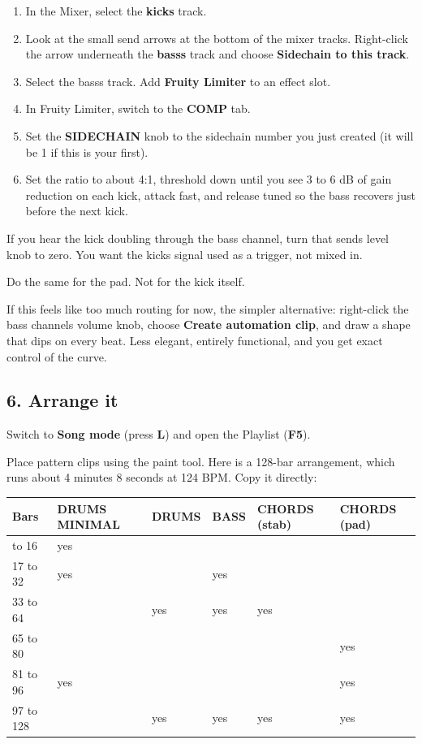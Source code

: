 \begin{enumerate}
\def\labelenumi{\arabic{enumi}.}
\tightlist
\item
  In the Mixer, select the \textbf{kick\textquotesingle s} track.
\item
  Look at the small send arrows at the bottom of the mixer tracks. Right-click the arrow
  underneath the \textbf{bass\textquotesingle s} track and choose \textbf{Sidechain to this track}.
\item
  Select the bass\textquotesingle s track. Add \textbf{Fruity Limiter} to an effect slot.
\item
  In Fruity Limiter, switch to the \textbf{COMP} tab.
\item
  Set the \textbf{SIDECHAIN} knob to the sidechain number you just created (it will be 1 if this
  is your first).
\item
  Set the ratio to about 4:1, threshold down until you see 3 to 6 dB of gain reduction on
  each kick, attack fast, and release tuned so the bass recovers just before the next kick.
\end{enumerate}

If you hear the kick doubling through the bass channel, turn that send\textquotesingle s level knob to zero.
You want the kick\textquotesingle s signal used as a trigger, not mixed in.

Do the same for the pad. Not for the kick itself.

If this feels like too much routing for now, the simpler alternative: right-click the bass
channel\textquotesingle s volume knob, choose \textbf{Create automation clip}, and draw a shape that dips on every
beat. Less elegant, entirely functional, and you get exact control of the curve.

\subsection{6. Arrange it}\label{fl03_first_track-6-arrange-it}

Switch to \textbf{Song mode} (press \textbf{L}) and open the Playlist (\textbf{F5}).

Place pattern clips using the paint tool. Here is a 128-bar arrangement, which runs about
4 minutes 8 seconds at 124 BPM. Copy it directly:

{\def\LTcaptype{none} %
\begin{longtable}[]{@{}llllll@{}}
\toprule\noalign{}
Bars & DRUMS MINIMAL & DRUMS & BASS & CHORDS (stab) & CHORDS (pad) \\
\midrule\noalign{}
\endhead
\bottomrule\noalign{}
\endlastfoot
1 to 16 & yes & & & & \\
17 to 32 & yes & & yes & & \\
33 to 64 & & yes & yes & yes & \\
65 to 80 & & & & & yes \\
81 to 96 & yes & & & & yes \\
97 to 128 & & yes & yes & yes & yes \\
\end{longtable}
}

